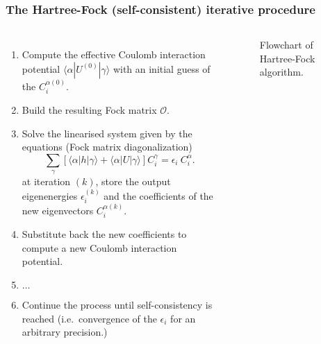 \documentclass[xcolor=pdftex,hyperref={pdfpagelabels=false},table]{beamer}
\begin{document}
\begin{frame}
\frametitle{The Hartree-Fock (self-consistent) iterative procedure}
\begin{scriptsize}
\begin{columns}[T,l]
\column{8cm}
\begin{enumerate}
 \item Compute the effective Coulomb interaction potential $\langle \alpha |U^{(0)}| \gamma \rangle$ with an initial guess of the $C_i^{\alpha(0)}$.
\item Build the resulting Fock matrix $\mathcal{O}$.
\item Solve the linearised system given by the equations \newline (Fock matrix diagonalization)
 \begin{equation}
\nonumber
\sum_\gamma \left[ \langle \alpha | h| \gamma \rangle +  \langle \alpha | U| \gamma \rangle \right] C_i^\gamma = \epsilon_i \ C_i^\alpha.
\end{equation}
at iteration $(k)$, store the output eigenenergies $\epsilon_i^{(k)}$  \newline and the coefficients of the new eigenvectors $C_i^{\alpha(k)}$.
\item Substitute back the new coefficients to compute a new Coulomb interaction potential.
\item $\dots$
\item Continue the process until self-consistency is reached  \newline (i.e.\ convergence of the $\epsilon_i$ for an arbitrary precision.)
\end{enumerate}
\column{3cm}
\begin{figure}
\centering
\scalebox{0.5}{}
\caption{Flowchart of Hartree-Fock algorithm.}
\end{figure}
\end{columns}
\end{scriptsize}
\end{frame}
\end{document}
